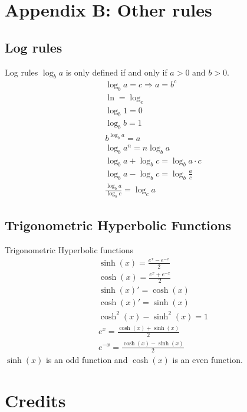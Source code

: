 \documentclass[letterpaper,10pt,twoside,twocolumn,openany]{book}
\begin{document}
\twocolumn

\chapter{Appendix B: Other rules}
\section{Log rules}
\begin{paperbox}{Log rules}
    $\log_b a$ is only defined if and only if $a > 0$ and $ b > 0$.
    \begin{gather}
        \log_b a = c \Rightarrow a = b^c\\
        \ln = \log_e\\
        \log_b 1 = 0\\
        \log_b b = 1\\
        b^{\log_b a} = a\\
        \log_b a^n = n \log_b a\\
        \log_b a + \log_b c = \log_b a \cdot c\\
        \log_b a - \log_b c = \log_b \frac{a}{c}\\
        \frac{\log_b a}{\log_b c} = \log_c a 
    \end{gather}
\end{paperbox}


\section{Trigonometric Hyperbolic Functions}
\begin{paperbox}{Trigonometric Hyperbolic functions}
    \begin{gather}
        \sinh (x) = \frac{e^x - e^{-x}}{2}\\
        \cosh (x) = \frac{e^x + e^{-x}}{2}\\
        \sinh(x)' = \cosh(x)\\
        \cosh(x)' = \sinh(x)\\
        \cosh^2(x) - \sinh^2(x) = 1\\
        e^x = \frac{\cosh(x) + \sinh(x)}{2}\\
        e^{-x} = \frac{\cosh(x) - \sinh(x)}{2}
    \end{gather}
    $\sinh (x)$ is an odd function and $ \cosh(x)$ is an even function.
\end{paperbox}
\chapter{Credits}
\end{document}
